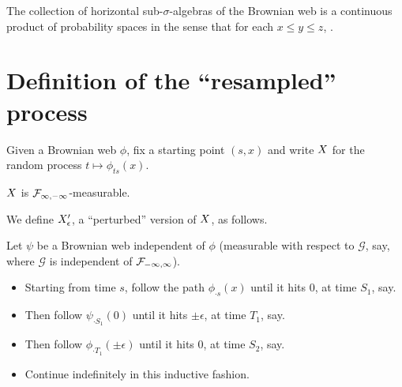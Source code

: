{\begin{theorem}
  The collection of horizontal sub-$\sigma$-algebras of the Brownian
  web is a continuous product of probability spaces in the sense that
  for each $x \le y \le z$,  .
\end{theorem}

\section{Definition of the ``resampled'' process}

\newcommand{\reservoir}{\mathcal{G}}

\newcommand{\twostrips}{\commafactor{\infty}{0} \tensor \commafactor{0}{-\infty}}
\newcommand{\onestrip}{\commafactor{\infty}{-\infty}}
\newcommand{\twostripsreservoir}{\twostrips \tensor \reservoir}

\begin{definition}
Given a Brownian web $\phi$, fix a starting point $(s,x)$ and write
$X$ for the random process $t \mapsto \phi_{ts}(x)$.
\end{definition}

\begin{obs}
  $X$ is $\onestrip$-measurable.
\end{obs}

\begin{definition}
  \newcommand{\webt}{\psi}

  We define $X'_{\epsilon}$, a ``perturbed'' version of $X$, as
  follows.

  Let $\webt$ be a Brownian web independent of $\phi$ (measurable with
  respect to $\reservoir$, say, where $\reservoir$ is independent of
  $\mathcal{F}_{-\infty,\infty}$).

  \begin{itemize}
  \item Starting from time $s$, follow the path $\phi_{\cdot s}(x)$
    until it hits $0$, at time $S_1$, say.
  \item Then follow $\webt_{\cdot S_1}(0)$ until it hits $\pm \epsilon$, at
    time $T_1$, say.
  \item Then follow $\phi_{\cdot T_1}(\pm \epsilon)$ until it hits $0$, at
    time $S_2$, say.
  \item Continue indefinitely in this inductive fashion.
  \end{itemize}
\end{definition}

}
